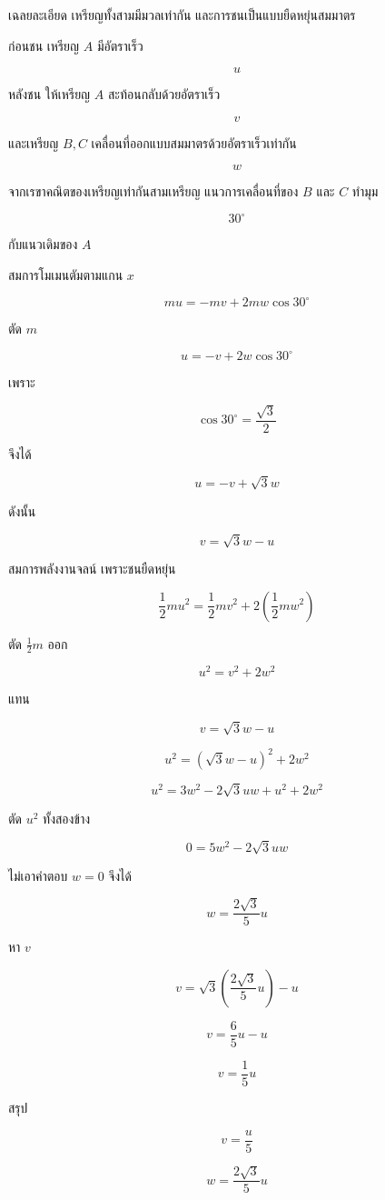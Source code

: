 \begin{examplebox}{เฉลยละเอียด}
เหรียญทั้งสามมีมวลเท่ากัน และการชนเป็นแบบยืดหยุ่นสมมาตร

ก่อนชน เหรียญ $A$ มีอัตราเร็ว

\[
u
\]

หลังชน ให้เหรียญ $A$ สะท้อนกลับด้วยอัตราเร็ว

\[
v
\]

และเหรียญ $B,C$ เคลื่อนที่ออกแบบสมมาตรด้วยอัตราเร็วเท่ากัน

\[
w
\]

จากเรขาคณิตของเหรียญเท่ากันสามเหรียญ แนวการเคลื่อนที่ของ $B$ และ $C$ ทำมุม

\[
30^\circ
\]

กับแนวเดิมของ $A$

สมการโมเมนตัมตามแกน $x$

\[
mu=-mv+2mw\cos30^\circ
\]

ตัด $m$

\[
u=-v+2w\cos30^\circ
\]

เพราะ

\[
\cos30^\circ=\frac{\sqrt{3}}{2}
\]

จึงได้

\[
u=-v+\sqrt{3}w
\]

ดังนั้น

\[
v=\sqrt{3}w-u
\]

สมการพลังงานจลน์ เพราะชนยืดหยุ่น

\[
\frac{1}{2}mu^2=\frac{1}{2}mv^2+2\left(\frac{1}{2}mw^2\right)
\]

ตัด $\frac{1}{2}m$ ออก

\[
u^2=v^2+2w^2
\]

แทน

\[
v=\sqrt{3}w-u
\]

\[
u^2=(\sqrt{3}w-u)^2+2w^2
\]

\[
u^2=3w^2-2\sqrt{3}uw+u^2+2w^2
\]

ตัด $u^2$ ทั้งสองข้าง

\[
0=5w^2-2\sqrt{3}uw
\]

ไม่เอาคำตอบ $w=0$ จึงได้

\[
w=\frac{2\sqrt{3}}{5}u
\]

หา $v$

\[
v=\sqrt{3}\left(\frac{2\sqrt{3}}{5}u\right)-u
\]

\[
v=\frac{6}{5}u-u
\]

\[
v=\frac{1}{5}u
\]

สรุป

\[
\boxed{v=\frac{u}{5}}
\]

\[
\boxed{w=\frac{2\sqrt{3}}{5}u}
\]
\end{examplebox}

